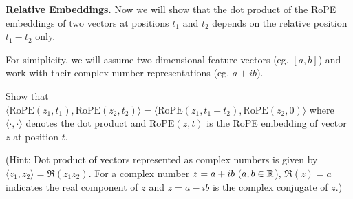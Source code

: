 \begin{parts}
\begin{subparts}
\subpart[1] \textbf{Relative Embeddings.} Now we will show that the dot product of the RoPE embeddings of two vectors at positions $t_1$ and $t_2$ depends on the relative position $t_1 - t_2$ only. 

For simiplicity, we will assume two dimensional feature vectors (eg. $[a, b]$) and work with their complex number representations (eg. $a + ib$).

Show that $\langle \text{RoPE}(z_1, t_1), \text{RoPE}(z_2, t_2) \rangle = \langle \text{RoPE}(z_1, t_1 - t_2), \text{RoPE}(z_2, 0) \rangle$ where $\langle \cdot, \cdot \rangle$ denotes the dot product and $\text{RoPE}(z, t)$ is the RoPE embedding of vector $z$ at position $t$.

(Hint: Dot product of vectors represented as complex numbers is given by $\langle z_1, z_2 \rangle = \Re(\overline{z_1} z_2)$. For a complex number $z = a + ib\ (a,b\in\R$), $\Re(z) = a$ indicates the real component of $z$ and $\bar{z} = a - ib$ is the complex conjugate of $z$.)


\end{subparts}
\end{parts}
